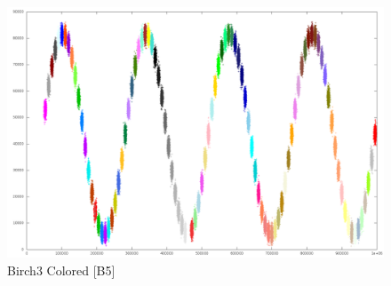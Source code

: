 \documentclass[10pt,utf8]{beamer}
\begin{document}
\begin{frame}
	\hspace{-16pt}
	\begin{figure}
		\centering
		\vspace{-31pt}
		\includegraphics[scale=0.25, keepaspectratio]{../output/pics/sine.png} 
		\vspace{-14pt}
		\caption{Birch3 Colored [B5]}
	\end{figure}
\end{frame}
\end{document}
